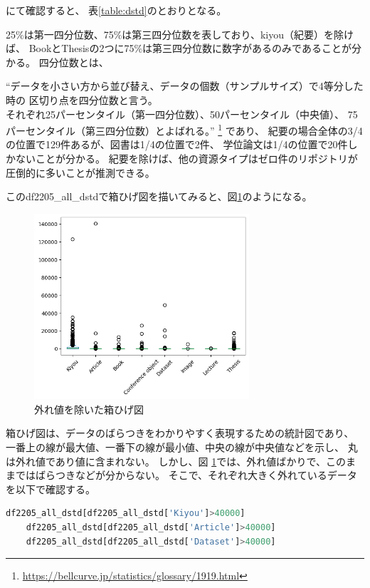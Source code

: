 \documentclass[submit,noauthor]{ono}
\begin{document}
にて確認すると、
表\ref{table:dstd}のとおりとなる。

25\%は第一四分位数、75\%は第三四分位数を表しており、kiyou（紀要）を除けば、
BookとThesisの2つに75\%は第三四分位数に数字があるのみであることが分かる。
四分位数とは、

“データを小さい方から並び替え、データの個数（サンプルサイズ）で4等分した時の
区切り点を四分位数と言う。\\
それぞれ25パーセンタイル（第一四分位数）、50パーセンタイル（中央値）、
75パーセンタイル（第三四分位数）とよばれる。”
\footnote{\url{https://bellcurve.jp/statistics/glossary/1919.html}}
であり、
紀要の場合全体の3/4の位置で129件あるが、図書は1/4の位置で2件、
学位論文は1/4の位置で20件しかないことが分かる。
紀要を除けば、他の資源タイプはゼロ件のリポジトリが圧倒的に多いことが推測できる。

このdf2205\_all\_dstdで箱ひげ図を描いてみると、図\ref{fig:box1}のようになる。

\begin{figure}[h]
	\includegraphics[width=8cm]{./picture/df2205alldstdboxplot.png}
	\caption{外れ値を除いた箱ひげ図}
	\label{fig:box1}
\end{figure}

箱ひげ図は、データのばらつきをわかりやすく表現するための統計図であり、
一番上の線が最大値、一番下の線が最小値、中央の線が中央値などを示し、
丸は外れ値であり値に含まれない。
しかし、図 \ref{fig:box1}では、外れ値ばかりで、このままではばらつきなどが分からない。
そこで、それぞれ大きく外れているデータを以下で確認する。

\begin{lstlisting}[language=Python,breaklines]
	df2205_all_dstd[df2205_all_dstd['Kiyou']>40000]
	df2205_all_dstd[df2205_all_dstd['Article']>40000]
	df2205_all_dstd[df2205_all_dstd['Dataset']>40000]
\end{lstlisting}
\end{document}
